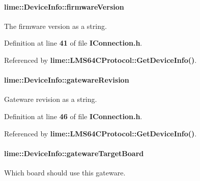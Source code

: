 \paragraph[{firmware\+Version}]{ lime\+::\+Device\+Info\+::firmware\+Version}\label{structlime_1_1DeviceInfo_a151d43ff932338725e54d601c05f81d0}


The firmware version as a string. 



Definition at line {\bf 41} of file {\bf I\+Connection.\+h}.



Referenced by {\bf lime\+::\+L\+M\+S64\+C\+Protocol\+::\+Get\+Device\+Info()}.

\paragraph[{gateware\+Revision}]{ lime\+::\+Device\+Info\+::gateware\+Revision}\label{structlime_1_1DeviceInfo_ab7533f48331331ffeda63c518518606b}


Gateware revision as a string. 



Definition at line {\bf 46} of file {\bf I\+Connection.\+h}.



Referenced by {\bf lime\+::\+L\+M\+S64\+C\+Protocol\+::\+Get\+Device\+Info()}.

\paragraph[{gateware\+Target\+Board}]{ lime\+::\+Device\+Info\+::gateware\+Target\+Board}\label{structlime_1_1DeviceInfo_abca451fe82d977e1ea3999fcbb47ff76}


Which board should use this gateware. 



